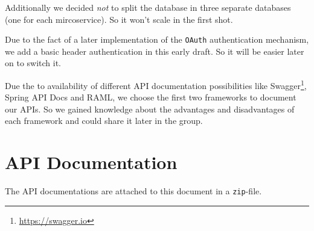 \documentclass[11pt]{article}
\begin{document}
	 Additionally we decided \textit{not} to split the database in three separate databases (one for each mircoservice). So it won't scale in the first shot. 
	
	Due to the fact of a later implementation of the \texttt{OAuth} authentication mechanism, we add a basic header authentication in this early draft. So it will be easier later on to switch it.
	
	Due the to availability of different API documentation possibilities like Swagger\footnote{\url{https://swagger.io}}, Spring API Docs and RAML, we choose the first two frameworks to document our APIs. So we gained knowledge about the advantages and disadvantages of each framework and could share it later in the group.
	
	\section{API Documentation}
	The API documentations are attached to this document in a \texttt{zip}-file.
	
\end{document}
